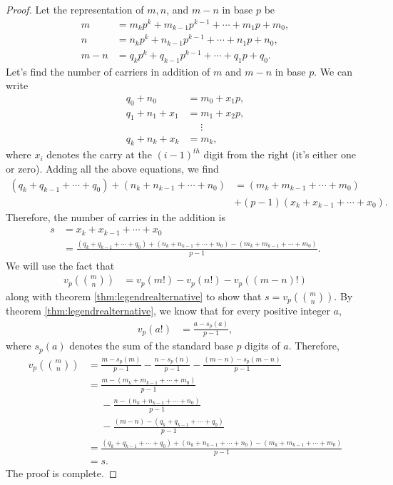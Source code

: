 \documentclass[12pt]{subfile}
\begin{document}
\begin{proof}
	Let the representation of $m, n$, and $m-n$ in base $p$ be
	\begin{align*}
	m   &= m_kp^k+m_{k-1}p^{k-1}+\cdots +m_1p+m_0,\\
	n   &= n_kp^k+n_{k-1}p^{k-1}+\cdots +n_1p+n_0,\\
	m-n &= q_kp^k+q_{k-1}p^{k-1}+\cdots +q_1p+q_0.
	\end{align*}
	Let's find the number of carriers in addition of $m$ and $m-n$ in base $p$. We can write
	\begin{align*}
	q_0+n_0  &= m_0 + x_1 p,\\
	q_1+n_1+x_1&= m_1 + x_2p,\\
	&\phantom{=}\vdots\\
	q_k+n_k+x_k&= m_k,
	\end{align*}
	where $x_i$ denotes the carry at the $(i-1)^{th}$ digit from the right (it's either one or zero). Adding all the above equations, we find
	\begin{align*}
	(q_k+q_{k-1}+\cdots+q_0)+(n_k+n_{k-1}+\cdots+n_0) &= (m_k+m_{k-1}+ \cdots+m_0)\\&+(p-1)(x_k+x_{k-1}+\cdots+x_0).
	\end{align*}
	Therefore, the number of carries in the addition is
	\begin{align*}
	s &= x_k+x_{k-1}+\cdots+x_0 \\
	&= \frac{(q_k+q_{k-1}+\cdots+q_0) + (n_k+n_{k-1}+\cdots+n_0) - (m_k+m_{k-1}+\cdots+m_0)}{p-1}.
	\end{align*}
	We will use the fact that
	\begin{align*}
	v_p\left( \binom{m}{n}\right) &= v_p(m!)-v_p(n!)-v_p((m-n)!)
	\end{align*}
	along with theorem \ref{thm:legendrealternative} to show that $s=v_p\left( \binom{m}{n}\right)$. By theorem \ref{thm:legendrealternative}, we know that for every positive integer $a$,
	\begin{align*}
	v_p(a!) & =\frac{a-s_p(a)}{p-1},
	\end{align*}
	where $s_p(a)$ denotes the sum of the standard base $p$ digits of $a$. Therefore,
	\begin{align*}
	v_p\left( \binom{m}{n}\right) &= \frac{m-s_p(m)}{p-1} - \frac{n-s_p(n)}{p-1} - \frac{(m-n)-s_p(m-n)}{p-1}\\
	&= \frac{m-(m_k+m_{k-1}+\cdots+m_0)}{p-1} \\&\phantom{=}-\frac{n-(n_k+n_{k-1}+\cdots+n_0)}{p-1} \\&\phantom{=}-\frac{(m-n)-(q_k+q_{k-1}+\cdots+q_0)}{p-1}\\
	&= \frac{(q_k+q_{k-1}+\cdots+q_0) + (n_k+n_{k-1}+\cdots+n_0) - (m_k+m_{k-1}+\cdots+m_0)}{p-1}\\
	&=s.
	\end{align*}
	The proof is complete.
\end{proof}
\end{document}
